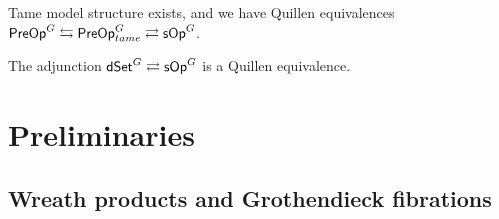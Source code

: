 \documentclass[a4paper,10pt
,draft
]{article}%
\renewcommand{\1}{\eta}%
\begin{document}

\begin{theorem}
      Tame model structure exists, and we have Quillen equivalences
      $\mathsf{PreOp}^G \leftrightarrows \mathsf{PreOp}^G_{tame} \rightleftarrows \mathsf{sOp}^G$.
\end{theorem}

\begin{theorem}
      \label{QE_THM}
      The adjunction $\mathsf{dSet}^G \rightleftarrows \mathsf{sOp}^G$ is a Quillen equivalence.
\end{theorem}

\section{Preliminaries}

\subsection{Wreath products and Grothendieck fibrations}


      
\end{document}
